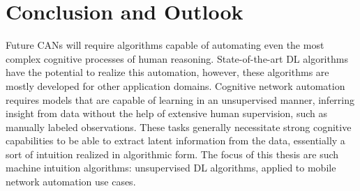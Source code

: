 \chapter{Conclusion and Outlook}
	\label{cha:conclusion}

	Future \acp{CAN} will require algorithms capable of automating even the most complex cognitive processes of human reasoning.
	State-of-the-art \ac{DL} algorithms have the potential to realize this automation, however, these algorithms are mostly developed for other application domains.
	Cognitive network automation requires models that are capable of learning in an unsupervised manner, inferring insight from data without the help of extensive human supervision, such as manually labeled observations.
	These tasks generally necessitate strong cognitive capabilities to be able to extract latent information from the data, essentially a sort of intuition realized in algorithmic form.
	The focus of this thesis are such machine intuition algorithms: unsupervised \ac{DL} algorithms, applied to mobile network automation use cases.
	
